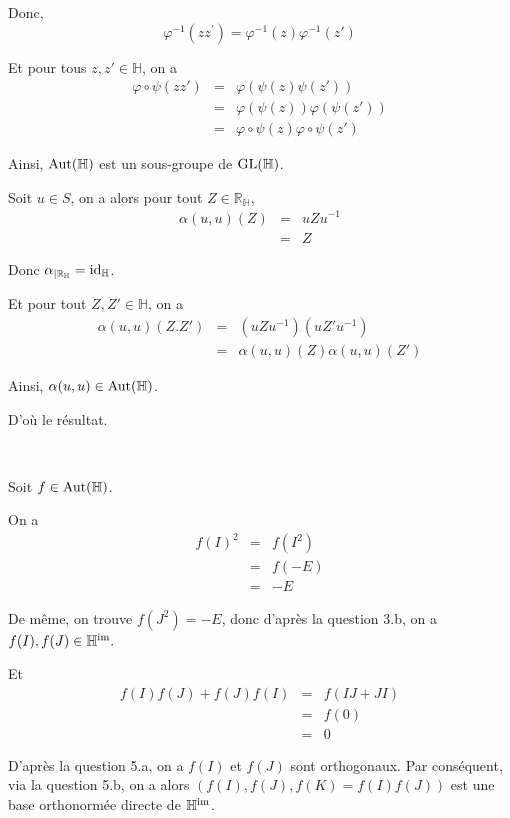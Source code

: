 Donc,
\[ \varphi^{- 1} (z z^{'}) = \varphi^{- 1} (z) \varphi^{- 1} (z') \]


Et pour tous $z, z' \in \mathbb{H}$, on a
\begin{eqnarray*}
  \varphi \circ \psi (z z') & = & \varphi (\psi (z) \psi (z'))\\
  & = & \varphi (\psi (z)) \varphi (\psi (z'))\\
  & = & \varphi \circ \psi (z) \varphi \circ \psi (z')
\end{eqnarray*}


Ainsi, $\operatorname{Aut} (\mathbb{H})$ est un sous-groupe de $\operatorname{GL}
(\mathbb{H})$.

Soit $u \in S$, on a alors pour tout $Z \in \mathbb{R}_{\mathbb{H}}$,
\begin{eqnarray*}
  \alpha (u, u) (Z) & = & u Z u^{- 1}\\
  & = & Z
\end{eqnarray*}


Donc $\alpha_{| \mathbb{R}_{\mathbb{H}} } = \operatorname{id}_{\mathbb{H}}$.

Et pour tout $Z, Z' \in \mathbb{H}$, on a
\begin{eqnarray*}
  \alpha (u, u) (Z.Z') & = & (u Z u^{- 1}) (u Z' u^{- 1})\\
  & = & \alpha (u, u) (Z) \alpha (u, u) (Z')
\end{eqnarray*}


Ainsi, $\alpha (u, u) \in \operatorname{Aut} (\mathbb{H})$.

D'o{\`u} le r{\'e}sultat.

\

 Soit $f \in \operatorname{Aut} (\mathbb{H})$.

On a
\begin{eqnarray*}
  f (I)^2 & = & f (I^2)\\
  & = & f (- E)\\
  & = & - E
\end{eqnarray*}


De m{\^e}me, on trouve $f (J^2) = - E$, donc d'apr{\`e}s la question 3.b, on a
$f (I), f (J) \in \mathbb{H}^{\operatorname{im}} .$

Et
\begin{eqnarray*}
  f (I) f (J) + f (J) f (I) & = & f (I J + J I)\\
  & = & f (0)\\
  & = & 0
\end{eqnarray*}


D'apr{\`e}s la question 5.a, on a $f (I)$ et $f (J)$ sont orthogonaux. Par
cons{\'e}quent, via la question 5.b, on a alors $(f (I), f (J), f (K) = f (I)
f (J))$ est une base orthonorm{\'e}e directe de $\mathbb{H}^{\operatorname{im}}$.

